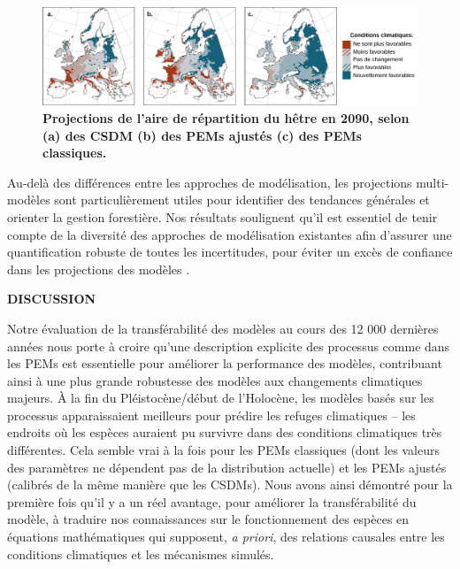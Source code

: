 \begin{figure}
\vspace*{-0cm}
\centering
\hspace*{-1.2cm}
\includegraphics[width = 20cm]{resume/figs/fagus_FR.pdf}
\caption{\textbf{Projections de l'aire de répartition du hêtre en 2090, selon (a) des CSDM (b) des PEMs ajustés (c) des PEMs classiques.}}
\vspace*{-0cm}
\label{fig:R5}
\end{figure}

Au-delà des différences entre les approches de modélisation, les projections multi-modèles sont particulièrement utiles pour identifier des tendances générales et orienter la gestion forestière. Nos résultats soulignent qu'il est essentiel de tenir compte de la diversité des approches de modélisation existantes afin d’assurer une quantification robuste de toutes les incertitudes, pour éviter un excès de confiance dans les projections des modèles \citep{Simmonds2024}. 

\vspace*{1cm}
{\noindent\large\bfseries\sffamily DISCUSSION} 

Notre évaluation de la transférabilité des modèles au cours des 12 000 dernières années nous porte à croire qu'une description explicite des processus comme dans les PEMs est essentielle pour améliorer la performance des modèles, contribuant ainsi à une plus grande robustesse des modèles aux changements climatiques majeurs. À la fin du Pléistocène/début de l’Holocène, les modèles basés sur les processus apparaissaient meilleurs pour prédire les refuges climatiques -- les endroits où les espèces auraient pu survivre dans des conditions climatiques très différentes.
Cela semble vrai à la fois pour les PEMs classiques (dont les valeurs des paramètres ne dépendent pas de la distribution actuelle) et les PEMs ajustés (calibrés de la même manière que les CSDMs). Nous avons ainsi démontré pour la première fois qu'il y a un réel avantage, pour améliorer la transférabilité du modèle, à traduire nos connaissances sur le fonctionnement des espèces en équations mathématiques qui supposent, \emph{a priori}, des relations causales entre les conditions climatiques et les mécanismes simulés. 


